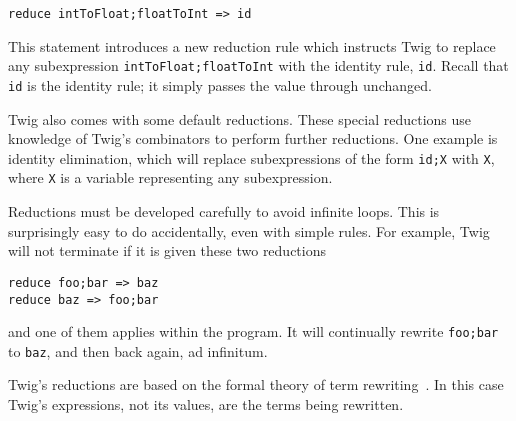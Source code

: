 \begin{verbatim}
reduce intToFloat;floatToInt => id
\end{verbatim}

This statement introduces a new reduction rule which instructs Twig to replace
any subexpression \texttt{intToFloat;floatToInt} with the identity rule,
\texttt{id}. Recall that \texttt{id} is the identity rule; it simply passes
the value through unchanged.

Twig also comes with some default reductions. These special reductions use
knowledge of Twig's combinators to perform further reductions. One example is
identity elimination, which will replace subexpressions of the form
\texttt{id;X} with \texttt{X}, where \texttt{X} is a variable representing any
subexpression.

Reductions must be developed carefully to avoid infinite loops. This is
surprisingly easy to do accidentally, even with simple rules. For example,
Twig will not terminate if it is given these two reductions

\begin{verbatim}
reduce foo;bar => baz
reduce baz => foo;bar
\end{verbatim}

and one of them applies within the program. It will continually rewrite
\texttt{foo;bar} to \texttt{baz}, and then back again, ad infinitum.

Twig's reductions are based on the formal theory of term
rewriting~\cite{baader98rewriting}. In this case Twig's expressions, not its
values, are the terms being rewritten.
